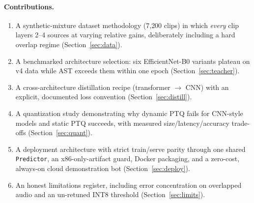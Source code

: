 \documentclass[11pt,a4paper]{article}
\begin{document}
\paragraph{Contributions.}
\begin{enumerate}[itemsep=2pt,topsep=3pt]
  \item A synthetic-mixture dataset methodology (7{,}200 clips) in which
        \emph{every} clip layers 2--4 sources at varying relative gains,
        deliberately including a hard overlap regime (Section~\ref{sec:data}).
  \item A benchmarked architecture selection: six EfficientNet-B0 variants
        plateau on v4 data while AST exceeds them within one epoch
        (Section~\ref{sec:teacher}).
  \item A cross-architecture distillation recipe (transformer
        $\rightarrow$ CNN) with an explicit, documented loss convention
        (Section~\ref{sec:distill}).
  \item A quantization study demonstrating why dynamic PTQ fails for
        CNN-style models and static PTQ succeeds, with measured
        size/latency/accuracy trade-offs (Section~\ref{sec:quant}).
  \item A deployment architecture with strict train/serve parity through one
        shared \texttt{Predictor}, an x86-only-artifact guard, Docker
        packaging, and a zero-cost, always-on cloud demonstration bot
        (Section~\ref{sec:deploy}).
  \item An honest limitations register, including error concentration on
        overlapped audio and an un-retuned INT8 threshold
        (Section~\ref{sec:limits}).
\end{enumerate}
\end{document}
